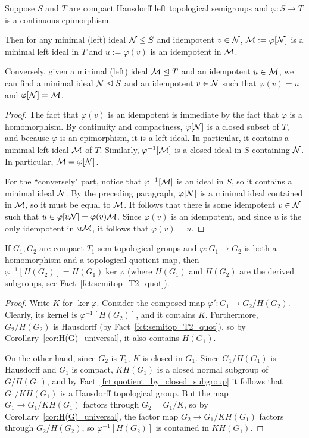 	
	\begin{prop}
		\label{prop:epim_ideals_idempotents}
		Suppose $S$ and $T$ are compact Hausdorff left topological semigroups and $\varphi\colon S\to T$ is a continuous epimorphism.
		
		Then for any minimal (left) ideal ${\mathcal N}\trianglelefteq S$ and idempotent $v\in {\mathcal N}$, ${\mathcal M}:=\varphi[{\mathcal N}]$ is a minimal left ideal in $T$ and $u:=\varphi(v)$ is an idempotent in ${\mathcal M}$.
		
		Conversely, given a minimal (left) ideal ${\mathcal M}\trianglelefteq T$ and an idempotent $u\in {\mathcal M}$, we can find a minimal ideal ${\mathcal N}\trianglelefteq S$ and an idempotent $v\in {\mathcal N}$ such that $\varphi(v)=u$ and $\varphi[{\mathcal N}]={\mathcal M}$.
	\end{prop}
	\begin{proof}
		The fact that $\varphi(v)$ is an idempotent is immediate by the fact that $\varphi$ is a homomorphism. By continuity and compactness, $\varphi[{\mathcal N}]$ is a closed subset of $T$, and because $\varphi$ is an epimorphism, it is a left ideal. In particular, it contains a minimal left ideal ${\mathcal M}$ of $T$. Similarly, $\varphi^{-1}[{\mathcal M}]$ is a closed ideal in $S$ containing ${\mathcal N}$. In particular, ${\mathcal M}=\varphi[{\mathcal N}]$.
		
		For the ``conversely" part, notice that $\varphi^{-1}[{\mathcal M}]$ is an ideal in $S$, so it contains a minimal ideal ${\mathcal N}$. By the preceding paragraph, $\varphi[{\mathcal N}]$ is a minimal ideal contained in ${\mathcal M}$, so it must be equal to ${\mathcal M}$. It follows that there is some idempotent $v\in {\mathcal N}$ such that $u\in \varphi[v{\mathcal N}]=\varphi(v){\mathcal M}$. Since $\varphi(v)$ is an idempotent, and since $u$ is the only idempotent in $u{\mathcal M}$, it follows that $\varphi(v)=u$.
	\end{proof}
	
	\begin{prop}
		\label{prop:preimage_of_derived}
		If $G_1,G_2$ are compact $T_1$ semitopological groups and $\varphi\colon G_1\to G_2$ is both a homomorphism and a topological quotient map, then $\varphi^{-1}[H(G_2)]=H(G_1)\ker \varphi$ (where $H(G_1)$ and $H(G_2)$ are the derived subgroups, see Fact~\ref{fct:semitop_T2_quot}).
	\end{prop}
	\begin{proof}
		Write $K$ for $\ker\varphi$. Consider the composed map $\varphi'\colon G_1\to G_2/H(G_2)$. Clearly, its kernel is $\varphi^{-1}[H(G_2)]$, and it contains $K$. Furthermore, $G_2/H(G_2)$ is Hausdorff (by Fact~\ref{fct:semitop_T2_quot}), so by Corollary~\ref{cor:H(G)_universal}, it also contains $H(G_1)$.
		
		On the other hand, since $G_2$ is $T_1$, $K$ is closed in $G_1$. Since $G_1/H(G_1)$ is Hausdorff and $G_1$ is compact, $KH(G_1)$ is a closed normal subgroup of $G/H(G_1)$, and by Fact~\ref{fct:quotient_by_closed_subgroup} it follows that $G_1/KH(G_1)$ is a Hausdorff topological group. But the map $G_1\to G_1/KH(G_1)$ factors through $G_2=G_1/K$, so by Corollary~\ref{cor:H(G)_universal}, the factor map $G_2\to G_1/KH(G_1)$ factors through $G_2/H(G_2)$, so $\varphi^{-1}[H(G_2)]$ is contained in $KH(G_1)$.
	\end{proof}
	

